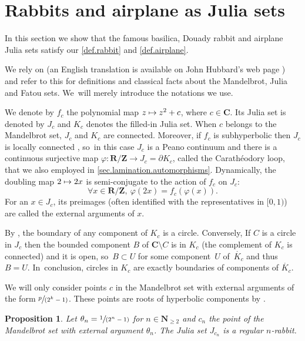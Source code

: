 \documentclass[JEP,XML,SOM,Unicode,NoFloatCountersInSection,published]{cedram}
\newcommand\mto{\mathchoice{\longmapsto}{\mapsto}{\mapsto}{\mapsto}}
\newcommand{\spfrac}[2]{\sfrac{#1}{(#2)}}
\theoremstyle{plain}
\newtheorem{proposition}[theorem]{Proposition}
\theoremstyle{definition}
\theoremstyle{remark}
\begin{document}
\section{Rabbits and airplane as Julia sets}
\label{sec.julia.sets}

In this section we show that the famous basilica, Douady rabbit and airplane Julia sets satisfy our \cref{def.rabbit} and \cref{def.airplane}.

We rely on \cite{douady-hubbard-I,douady-hubbard-II} (an English translation is available on John Hubbard's web page \cite{Douady-Hubbard-English}) and refer to this for definitions and classical facts about the Mandelbrot, Julia and Fatou sets. We~will merely introduce the notations we use.

We denote by $f_c$ the polynomial map $z\mto z^2+c$, where $c\in\mathbf{C}$.
Its Julia set is denoted by $J_{c}$ and $K_c$ denotes the filled-in Julia set.
When $c$ belongs to the Mandelbrot set, $J_c$ and $K_c$ are connected.
Moreover, if $f_c$ is subhyperbolic then $J_c$ is locally connected \cite[Prop.\,4, Exp.\,III]{douady-hubbard-I}, so~in this case $J_c$ is a Peano continuum and there is a continuous surjective map $\varphi\colon \mathbf{R}/\mathbf{Z}\to J_c=\partial K_c$, called the Carathéodory loop, that we also employed in \cref{sec.lamination.automorphisms}.
Dynamically, the doubling map $2\mto 2x$ is semi-conjugate to the action of $f_c$ on $J_c$:
\[
\forall x\in\mathbf{R}/\mathbf{Z},\ \varphi(2x)=f_c(\varphi(x)).
\]
For an $x\in J_c$, its preimages (often identified with the representatives in $[0,1)$) are called the external arguments of $x$.

By \cite[Prop.\,3, Exp.\,II]{douady-hubbard-I}, the boundary of any component of $K_{c}$ is a circle.
Conversely, If $C$ is a circle in $J_{c}$ then the bounded component $B$ of $\mathbf{C}\setminus C$ is in $K_{c}$ (the complement of $K_{c}$ is connected) and it is open, so~$B\subset U$ for some component~$U$ of~$\mathring{K_{c}}$ and thus $B=U$. In~conclusion, circles in $K_{c}$ are exactly boundaries of components of $\mathring{K_{c}}$.

We will only consider points $c$ in the Mandelbrot set with external arguments of the form $\spfrac{p}{2^k-1}$.
These points are roots of hyperbolic components by \cite[Exp.\,VIII, Th.\,1]{douady-hubbard-II}.


\begin{proposition}
Let $\theta_n=\spfrac{1}{2^n-1}$ for $n\in\mathbf{N}_{\geq2}$ and $c_n$ the point of the Mandelbrot set with external argument $\theta_n$.
The Julia set $J_{c_n}$ is a regular $n$-rabbit.
\end{proposition}
\end{document}
